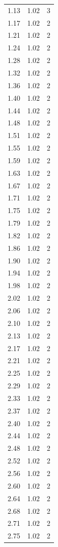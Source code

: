 \begin{longtable}{lrr}
  1.13 & 1.02 & 3 \\
  1.17 & 1.02 & 2 \\
  1.21 & 1.02 & 2 \\
  1.24 & 1.02 & 2 \\
  1.28 & 1.02 & 2 \\
  1.32 & 1.02 & 2 \\
  1.36 & 1.02 & 2 \\
  1.40 & 1.02 & 2 \\
  1.44 & 1.02 & 2 \\
  1.48 & 1.02 & 2 \\
  1.51 & 1.02 & 2 \\
  1.55 & 1.02 & 2 \\
  1.59 & 1.02 & 2 \\
  1.63 & 1.02 & 2 \\
  1.67 & 1.02 & 2 \\
  1.71 & 1.02 & 2 \\
  1.75 & 1.02 & 2 \\
  1.79 & 1.02 & 2 \\
  1.82 & 1.02 & 2 \\
  1.86 & 1.02 & 2 \\
  1.90 & 1.02 & 2 \\
  1.94 & 1.02 & 2 \\
  1.98 & 1.02 & 2 \\
  2.02 & 1.02 & 2 \\
  2.06 & 1.02 & 2 \\
  2.10 & 1.02 & 2 \\
  2.13 & 1.02 & 2 \\
  2.17 & 1.02 & 2 \\
  2.21 & 1.02 & 2 \\
  2.25 & 1.02 & 2 \\
  2.29 & 1.02 & 2 \\
  2.33 & 1.02 & 2 \\
  2.37 & 1.02 & 2 \\
  2.40 & 1.02 & 2 \\
  2.44 & 1.02 & 2 \\
  2.48 & 1.02 & 2 \\
  2.52 & 1.02 & 2 \\
  2.56 & 1.02 & 2 \\
  2.60 & 1.02 & 2 \\
  2.64 & 1.02 & 2 \\
  2.68 & 1.02 & 2 \\
  2.71 & 1.02 & 2 \\
  2.75 & 1.02 & 2 \\

\end{longtable}
